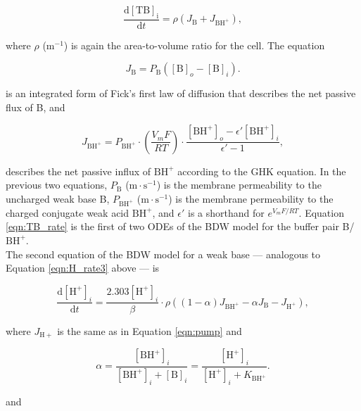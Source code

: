 \documentclass[fleqn,10pt]{physiome}
\begin{document}
\begin{equation}
\dfrac{\mathrm{d[TB]_i}}{\mathrm{d}t}=\rho\left(J_\mathrm{B}+J_\mathrm{BH^+}\right),
\label{eqn:TB_rate}
\end{equation}

where $\rho$ ($\mathrm{m^{-1}}$) is again the area-to-volume ratio for the cell. The equation

\begin{equation}
J_\mathrm{B}=P_\mathrm{B}(\mathrm{[B]}_o-\mathrm{[B]}_i).
\label{eqn:J_B}
\end{equation}

is an integrated form of Fick's first law of diffusion that describes the net passive flux of B, and

\begin{equation}
J_\mathrm{BH^+}=P_\mathrm{BH^+}\cdot\left(\dfrac{V_mF}{RT}\right)\cdot\dfrac{\mathrm{[BH^+]}_o-\epsilon '\mathrm{[BH^+]}_i}{\epsilon '-1},
\label{eqn:J_BH}
\end{equation}

describes the net passive influx of $\mathrm{BH^+}$ according to the GHK equation. In the previous two equations, $P_\mathrm{B}$ ($\mathrm{m\cdot s^{-1}}$) is the membrane permeability to the uncharged weak base B, $P_\mathrm{{BH^+}}$ ($\mathrm{m\cdot s^{-1}}$) is the membrane permeability to the charged conjugate weak acid $\mathrm{BH^+}$, and $\epsilon '$ is a shorthand for $e^{{V_mF}/{RT}}$. Equation \ref{eqn:TB_rate} is the first of two ODEs of the BDW model for the buffer pair B/$\mathrm{BH^+}$.\\

The second equation of the BDW model for a weak base --- analogous to Equation \ref{eqn:H_rate3} above --- is

\begin{equation}
\dfrac{\mathrm{d[H^+]}_i}{\mathrm{d}t}=\dfrac{2.303\mathrm{[H^+]}_i}{\beta}\cdot \rho\left((1-\alpha)J_\mathrm{BH^+}-\alpha J_\mathrm{B}-J_\mathrm{H^+}\right),
\label{eqn:H_rate_B}
\end{equation}

where $J_\mathrm{H+}$ is the same as in Equation \ref{eqn:pump} and 

\begin{equation}
\alpha=\dfrac{\mathrm{[BH^+]}_i}{\mathrm{[BH^+]}_i+\mathrm{[B]}_i}=\dfrac{\mathrm{[H^+]}_i}{\mathrm{[H^+]}_i+K_\mathrm{BH^+}}.
\label{eqn:alpha_B}
\end{equation}

and
\end{document}

